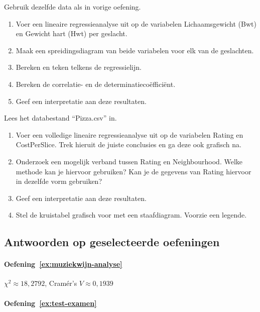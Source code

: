 \begin{exercise}
  \label{ex:cats-per-geslacht}
	Gebruik dezelfde data als in vorige oefening.
		\begin{enumerate}
		\item Voer een lineaire regressieanalyse uit op de variabelen Lichaamsgewicht (Bwt) en Gewicht hart (Hwt) per geslacht.
		\item Maak een spreidingsdiagram van beide variabelen voor elk van de geslachten.
		\item Bereken en teken telkens de regressielijn.
		\item Bereken de correlatie- en de determinatiecoëfficiënt.
		\item Geef een interpretatie aan deze resultaten.
	\end{enumerate}
\end{exercise}

\begin{exercise}
  \label{ex:pizza}
	Lees het databestand ``Pizza.csv'' in.
		\begin{enumerate}
		\item Voer een volledige lineaire regressieanalyse uit op de variabelen Rating en CostPerSlice. Trek hieruit de juiste conclusies en ga deze ook grafisch na.
		\item Onderzoek een mogelijk verband tussen Rating en Neighbourhood. Welke methode kan je hiervoor gebruiken? Kan je de gegevens van Rating hiervoor in dezelfde vorm gebruiken?
		\item Geef een interpretatie aan deze resultaten.
		\item Stel de kruistabel grafisch voor met een staafdiagram.  Voorzie een legende.
	\end{enumerate}
\end{exercise}

\subsection{Antwoorden op geselecteerde oefeningen}
\label{ssec:analyse-2-variabelen-oplossingen}

\paragraph{Oefening~\ref{ex:muziekwijn-analyse}}

$\chi^2 \approx 18,2792$, Cramér's $V \approx 0,1939$

\paragraph{Oefening~\ref{ex:test-examen}}

